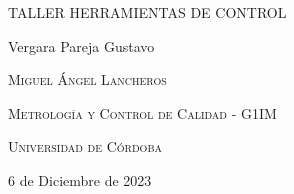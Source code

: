 \documentclass{article}
\author{Gustavo Vergara}
\theoremstyle{mytheoremstyle}
\theoremstyle{mytheoremstyle}
\theoremstyle{myproblemstyle}
\begin{document}
\pgfplotsset{compat=1.18}

\begin{titlepage}
	\centering
	\vspace{2.5cm}
	{\scshape \Large TALLER HERRAMIENTAS DE CONTROL \par}
	\vspace{5cm}
	\textbf\large\scshape{\par}
	\vspace{0.5cm}

	{\Large Vergara Pareja Gustavo\par}
	\vspace{5cm}
	{\scshape\Large Miguel Ángel Lancheros\par}
	\vspace{0.3cm}
	{\scshape\Large Metrología y Control de Calidad - G1IM \par}
	\vspace{0.3cm}
	{\scshape\Large Universidad de Córdoba\par}
	\vspace{0.3cm}
	{\Large 6 de Diciembre de 2023 \par}
\end{titlepage}
\newpage
\end{document}
